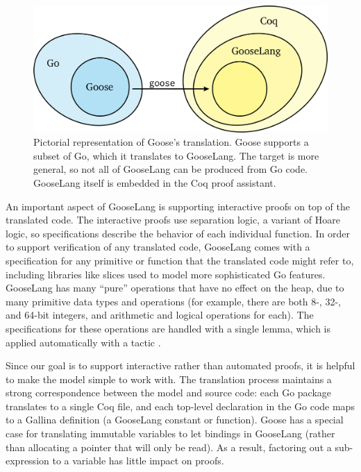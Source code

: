 \begin{figure}
  \centering
  \includegraphics{fig/goose.png}
  \vspace{0.5\baselineskip}
  \caption[Representation of Goose's translation support]%
  {Pictorial representation of Goose's translation. Goose supports a subset of
    Go, which it translates to GooseLang. The target is more general, so not all
    of GooseLang can be produced from Go code. GooseLang itself is embedded in
    the Coq proof assistant.}
  \label{fig:goose:overview}
\end{figure}

An important aspect of GooseLang is supporting interactive proofs on top
of the translated code. The interactive proofs use separation logic, a
variant of Hoare logic, so specifications describe the behavior of each
individual function. In order to support verification of any translated
code, GooseLang comes with a specification for any primitive or function
that the translated code might refer to, including libraries like slices
used to model more sophisticated Go features. GooseLang has many
``pure'' operations that have no effect on the heap, due to many
primitive data types and operations (for example, there are both 8-,
32-, and 64-bit integers, and arithmetic and logical operations for
each). The specifications for these operations are handled with a single
lemma, which is applied automatically with a tactic .

Since our goal is to support interactive rather than automated proofs,
it is helpful to make the model simple to work with. The translation process maintains
a strong correspondence between the model and source code: each Go
package translates to a single Coq file, and each top-level declaration
in the Go code maps to a Gallina definition (a GooseLang constant or
function). Goose has a special case for translating immutable variables
to let bindings in GooseLang (rather than allocating a pointer that will
only be read). As a result, factoring out a sub-expression to a variable
has little impact on proofs.


